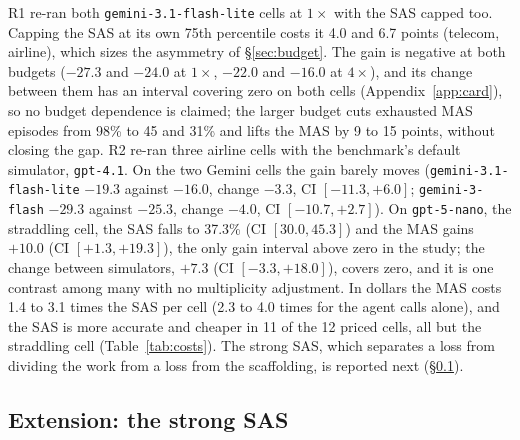 R1 re-ran both \texttt{gemini-3.1-flash-lite} cells at $1\times$ with the SAS capped too. Capping the SAS at its own 75th percentile costs it 4.0 and 6.7 points (telecom, airline), which sizes the asymmetry of \S\ref{sec:budget}. The gain is negative at both budgets ($-27.3$ and $-24.0$ at $1\times$, $-22.0$ and $-16.0$ at $4\times$), and its change between them has an interval covering zero on both cells (Appendix~\ref{app:card}), so no budget dependence is claimed; the larger budget cuts exhausted MAS episodes from 98\% to 45 and 31\% and lifts the MAS by 9 to 15 points, without closing the gap. R2 re-ran three airline cells with the benchmark's default simulator, \texttt{gpt-4.1}. On the two Gemini cells the gain barely moves (\texttt{gemini-3.1-flash-lite} $-19.3$ against $-16.0$, change $-3.3$, CI $[-11.3, +6.0]$; \texttt{gemini-3-flash} $-29.3$ against $-25.3$, change $-4.0$, CI $[-10.7, +2.7]$). On \texttt{gpt-5-nano}, the straddling cell, the SAS falls to 37.3\% (CI $[30.0, 45.3]$) and the MAS gains $+10.0$ (CI $[+1.3, +19.3]$), the only gain interval above zero in the study; the change between simulators, $+7.3$ (CI $[-3.3, +18.0]$), covers zero, and it is one contrast among many with no multiplicity adjustment. In dollars the MAS costs 1.4 to 3.1 times the SAS per cell (2.3 to 4.0 times for the agent calls alone), and the SAS is more accurate and cheaper in 11 of the 12 priced cells, all but the straddling cell (Table~\ref{tab:costs}). The strong SAS, which separates a loss from dividing the work from a loss from the scaffolding, is reported next (\S\ref{sec:extension}).

\subsection{Extension: the strong SAS}
\label{sec:extension}
\label{app:extension}


